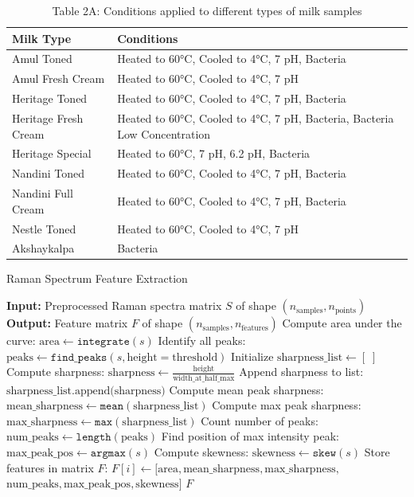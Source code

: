 \begin{table}[h!]
\centering
\begin{tabular}{|l|p{10cm}|}
\hline
\textbf{Milk Type} & \textbf{Conditions} \\
\hline
Amul Toned & Heated to 60°C, Cooled to 4°C, 7 pH, Bacteria \\
Amul Fresh Cream & Heated to 60°C, Cooled to 4°C, 7 pH \\
Heritage Toned & Heated to 60°C, Cooled to 4°C, 7 pH, Bacteria \\
Heritage Fresh Cream & Heated to 60°C, Cooled to 4°C, 7 pH, Bacteria, Bacteria Low Concentration \\
Heritage Special & Heated to 60°C, 7 pH, 6.2 pH, Bacteria \\
Nandini Toned & Heated to 60°C, Cooled to 4°C, 7 pH, Bacteria \\
Nandini Full Cream & Heated to 60°C, Cooled to 4°C, 7 pH, Bacteria \\
Nestle Toned & Heated to 60°C, Cooled to 4°C, 7 pH \\
Akshaykalpa & Bacteria \\
\hline
\end{tabular}
\caption*{Table 2A: Conditions applied to different types of milk samples}
\label{tab:milk_conditions}
\end{table}

\begin{algorithm}
\caption{Raman Spectrum Feature Extraction}
\begin{algorithmic}[1]
\State \textbf{Input:} Preprocessed Raman spectra matrix $S$ of shape $(n_{\text{samples}}, n_{\text{points}})$
\State \textbf{Output:} Feature matrix $F$ of shape $(n_{\text{samples}}, n_{\text{features}})$
    \State Compute area under the curve: $ \text{area} \gets \texttt{integrate}(s)$
    \State Identify all peaks: $ \text{peaks} \gets \texttt{find\_peaks}(s, \text{height} = \text{threshold})$
    \State Initialize $ \text{sharpness\_list} \gets [\;]$
        \State Compute sharpness: $ \text{sharpness} \gets \frac{\text{height}}{\text{width\_at\_half\_max}}$
        \State Append sharpness to list: $ \text{sharpness\_list.append(sharpness)}$
    \EndFor
    \State Compute mean peak sharpness: $ \text{mean\_sharpness} \gets \texttt{mean}( \text{sharpness\_list})$
    \State Compute max peak sharpness: $ \text{max\_sharpness} \gets \texttt{max}( \text{sharpness\_list})$
    \State Count number of peaks: $ \text{num\_peaks} \gets \texttt{length}(\text{peaks})$
    \State Find position of max intensity peak: $ \text{max\_peak\_pos} \gets \texttt{argmax}(s)$
    \State Compute skewness: $ \text{skewness} \gets \texttt{skew}(s)$
    \State Store features in matrix $F$:
    \Statex \hspace{\algorithmicindent}$F[i] \gets [\text{area}, \text{mean\_sharpness}, \text{max\_sharpness},$
    \Statex \hspace{\algorithmicindent} \phantom{$F[i] \gets [$}$\text{num\_peaks}, \text{max\_peak\_pos}, \text{skewness}]$
\EndFor
\State \Return $F$
\end{algorithmic}
\label{alg:feature_extraction}
\end{algorithm}

